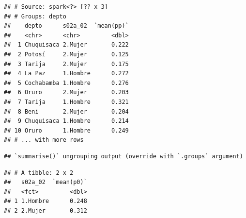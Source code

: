 \documentclass[
]{article}
\newenvironment{Shaded}{\begin{snugshade}}{\end{snugshade}}
\newcommand{\CommentTok}[1]{\textcolor[rgb]{0.56,0.35,0.01}{\textit{#1}}}
\newcommand{\DataTypeTok}[1]{\textcolor[rgb]{0.13,0.29,0.53}{#1}}
\newcommand{\DecValTok}[1]{\textcolor[rgb]{0.00,0.00,0.81}{#1}}
\newcommand{\KeywordTok}[1]{\textcolor[rgb]{0.13,0.29,0.53}{\textbf{#1}}}
\newcommand{\NormalTok}[1]{#1}
\newcommand{\OperatorTok}[1]{\textcolor[rgb]{0.81,0.36,0.00}{\textbf{#1}}}
\newcommand{\StringTok}[1]{\textcolor[rgb]{0.31,0.60,0.02}{#1}}
\begin{document}
\begin{verbatim}
## # Source: spark<?> [?? x 3]
## # Groups: depto
##    depto      s02a_02  `mean(pp)`
##    <chr>      <chr>         <dbl>
##  1 Chuquisaca 2.Mujer       0.222
##  2 Potosí     2.Mujer       0.125
##  3 Tarija     2.Mujer       0.175
##  4 La Paz     1.Hombre      0.272
##  5 Cochabamba 1.Hombre      0.276
##  6 Oruro      2.Mujer       0.203
##  7 Tarija     1.Hombre      0.321
##  8 Beni       2.Mujer       0.204
##  9 Chuquisaca 1.Hombre      0.214
## 10 Oruro      1.Hombre      0.249
## # ... with more rows
\end{verbatim}

\begin{Shaded}
\end{Shaded}

\begin{verbatim}
## `summarise()` ungrouping output (override with `.groups` argument)
\end{verbatim}

\begin{verbatim}
## # A tibble: 2 x 2
##   s02a_02  `mean(p0)`
##   <fct>         <dbl>
## 1 1.Hombre      0.248
## 2 2.Mujer       0.312
\end{verbatim}

\begin{Shaded}
\end{Shaded}
\end{document}
